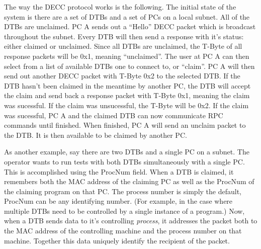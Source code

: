 \documentclass{article}
\begin{document}
The way the DECC protocol works is the following. The initial state of the
system is there are a set of DTBs and a set of PCs on a local subnet. All of the
DTBs are unclaimed. PC A sends out a ``Hello'' DECC packet which is broadcast
throughout the subnet. Every DTB will then send a response with it's status:
either claimed or unclaimed. Since all DTBs are unclaimed, the T-Byte of all
response packets will be 0x1, meaning ``unclaimed''. The user at PC A can then
select from a list of available DTBs one to connect to, or ``claim''. PC A will 
then send out another DECC packet with T-Byte 0x2 to the selected DTB. If the
DTB hasn't been claimed in the meantime by another PC, the DTB will accept the
claim and send back a response packet with T-Byte 0x1, meaning the claim was
sucessful. If the claim was unsucessful, the T-Byte will be 0x2. If the claim
was sucessful, PC A and the claimed DTB can now communicate RPC commands until
finished. When finished, PC A will send an unclaim packet to the DTB. It is then
available to be claimed by another PC. 

As another example, say there are two DTBs and a single PC on a subnet. The
operator wants to run tests with both DTBs simultaneously with a single PC. This
is accomplished using the ProcNum field. When a DTB is claimed, it remembers
both the MAC address of the claiming PC as well as the ProcNum of the claiming
program on that PC. The process number is simply the default, ProcNum can be any
identifying number. (For example, in the case where multiple DTBs need to be
controlled by a single instance of a program.) Now, when a DTB sends data to
it's controlling \textit{process}, it addresses the packet both to the MAC
address of the controlling machine and the process number on that machine.
Together this data uniquely identify the recipient of the packet.
\end{document}
